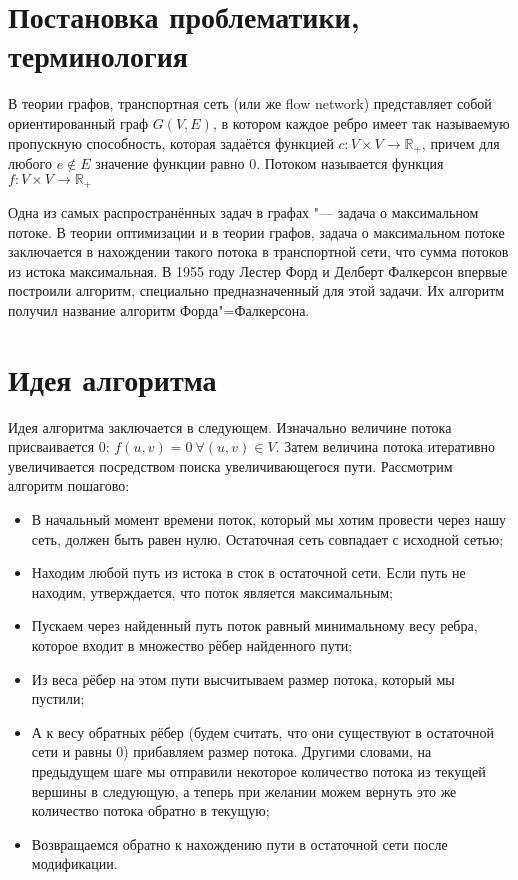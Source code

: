 \documentclass[otchet, times]{SCWorks}
\begin{document}
\date{2025}

\maketitle

\secNumbering
\tableofcontents

\newpage
\section{Постановка проблематики, терминология}
В теории графов, транспортная сеть (или же flow network) представляет собой ориентированный граф $G(V, E)$, в котором каждое ребро имеет так называемую пропускную способность, которая задаётся функцией 
$c:V \times V\rightarrow \mathbb{R}_+ $, причем для любого $e \notin E$ значение функции равно 0. Потоком называется функция $f:V \times V \rightarrow \mathbb{R}_+$

Одна из самых распространённых задач в графах "--- задача о максимальном потоке. В теории оптимизации и в теории графов, задача о максимальном потоке заключается в нахождении такого потока в транспортной сети, что сумма потоков из истока максимальная. В 1955 году Лестер Форд и Делберт Фалкерсон впервые построили алгоритм, специально предназначенный для этой задачи. Их алгоритм получил название алгоритм Форда"=Фалкерсона.

\section{Идея алгоритма}
Идея алгоритма заключается в следующем. Изначально величине потока присваивается 0: $f(u,v) = 0 ~\forall (u,v) \in V$. Затем величина потока итеративно увеличивается посредством поиска увеличивающегося пути. Рассмотрим алгоритм пошагово:
\begin{itemize}
    \item     В начальный момент времени поток, который мы хотим провести через нашу сеть, должен быть равен нулю. Остаточная сеть совпадает с исходной сетью;
    \item     Находим любой путь из истока в сток в остаточной сети. Если путь не находим, утверждается, что поток является максимальным;
    \item     Пускаем через найденный путь поток равный минимальному весу ребра, которое входит в множество рёбер найденного пути;
    \item     Из веса рёбер на этом пути высчитываем размер потока, который мы пустили;
    \item     А к весу обратных рёбер (будем считать, что они существуют в остаточной сети и равны 0) прибавляем размер потока. Другими словами, на предыдущем шаге мы отправили некоторое количество потока из текущей вершины в следующую, а теперь при желании можем вернуть это же количество потока обратно в текущую;
    \item    Возвращаемся обратно к нахождению пути в остаточной сети после модификации.
\end{itemize}
\end{document}
